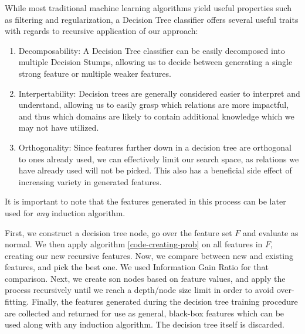 \documentclass[twoside,11pt]{article}
\theoremstyle{definition}
\begin{document}
While most traditional machine learning algorithms yield useful properties such as filtering and regularization, a Decision Tree classifier offers several useful traits with regards to recursive application of our approach:
\begin{enumerate}
	\item Decomposability: A Decision Tree classifier can be easily decomposed into multiple Decision Stumps, allowing us to decide between generating a single strong feature or multiple weaker features.
	\item Interpertability: Decision trees are generally considered easier to interpret and understand, allowing us to easily grasp which relations are more impactful, and thus which domains are likely to contain additional knowledge which we may not have utilized.
	\item Orthogonality: Since features further down in a decision tree are orthogonal to ones already used, we can effectively limit our search space, as relations we have already used will not be picked. This also has a beneficial side effect of increasing variety in generated features.
\end{enumerate}
It is important to note that the features generated in this process can be later used for \emph{any} induction algorithm.

First, we construct a decision tree node, go over the feature set $F$ and evaluate as normal. We then apply algorithm \ref{code-creating-prob} on all features in $F$, creating our new recursive features. Now, we compare between new and existing features, and pick the best one. We used Information Gain Ratio \cite{quinlan1986} for that comparison.  
Next, we create son nodes based on feature values, and apply the process recursively until we reach a depth/node size limit in order to avoid over-fitting. 
Finally, the features generated during the decision tree training procedure are collected and returned for use as general, black-box features which can be used along with any induction algorithm. The decision tree itself is discarded.
\end{document}
